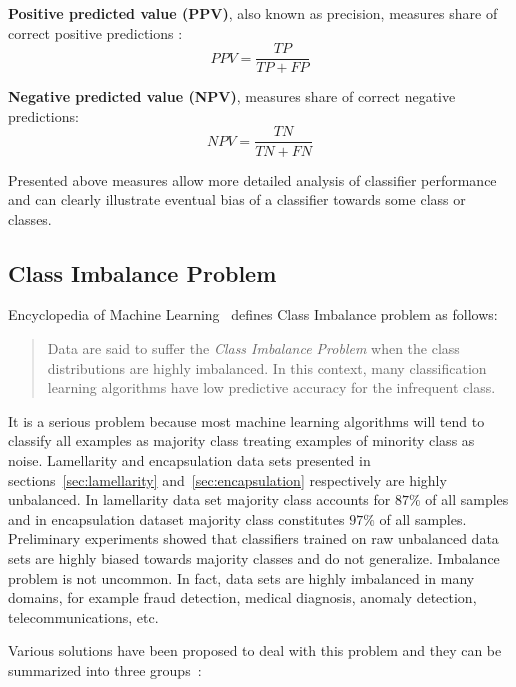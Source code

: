 \documentclass[a4paper, 11pt, table]{article}
\begin{document}
\textbf{Positive predicted value (PPV)}, also known as precision, measures share of correct positive predictions :
\begin{equation*}
PPV = \frac{TP}{TP + FP}
\end{equation*}

\textbf{Negative predicted value (NPV)}, measures share of correct negative predictions:
\begin{equation*}
NPV = \frac{TN}{TN + FN}
\end{equation*}

Presented above measures allow more detailed analysis of classifier performance and can clearly illustrate eventual bias of a classifier towards some class or classes. 

\subsection{Class Imbalance Problem}
\label{sec:class_imbalance}
Encyclopedia of Machine Learning~\cite{Ling2010} defines Class Imbalance problem as follows:
\blockquote{Data are said to suffer the \textit{Class Imbalance Problem} when the class distributions are highly imbalanced. In this context, many classification learning algorithms have low predictive accuracy for the infrequent class.}

It is a serious problem because most machine learning algorithms will tend to classify all examples as majority class treating examples of minority class as noise. Lamellarity and encapsulation data sets presented in sections~\ref{sec:lamellarity} and~\ref{sec:encapsulation} respectively are highly unbalanced. In lamellarity data set majority class accounts for $87\%$ of all samples and in encapsulation dataset majority class constitutes $97\%$ of all samples. Preliminary experiments showed that classifiers trained on raw unbalanced data sets are highly biased towards majority classes and do not generalize. Imbalance problem is not uncommon. In fact, data sets are highly imbalanced in many domains, for example fraud detection, medical diagnosis, anomaly detection, telecommunications, etc. 

Various solutions have been proposed to deal with this problem and they can be summarized into three groups~\cite{Lopez2013113}:
\end{document}
